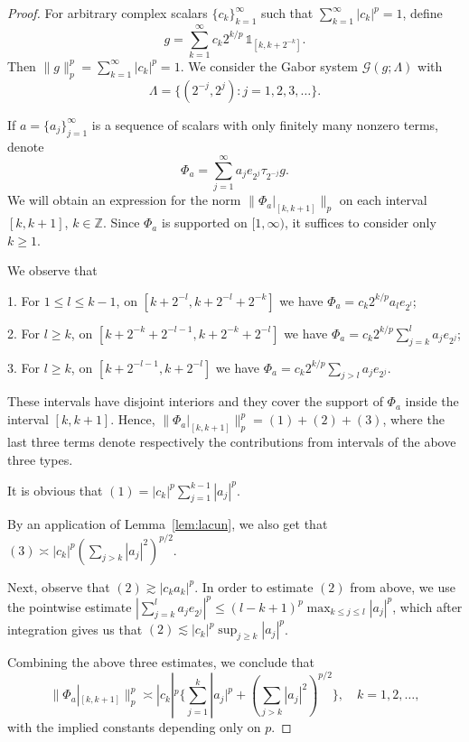 \documentclass[reqno,a4paper,12pt]{amsart}
\numberwithin{equation}{section}
\numberwithin{figure}{section}
\newcommand\Z{\mathbb{Z}}
\newcommand\G{\mathcal{G}}
\newcommand\Lam{\Lambda}
\newcommand\1{\mathds{1}}
\newcommand{\ts}{\tau}
\renewcommand\le{\leqslant}
\renewcommand\ge{\geqslant}
\theoremstyle{plain}
\newcommand{\lemref}[1]{Lemma~\ref{#1}}
\theoremstyle{definition}
\begin{document}
\begin{proof}
For arbitrary complex scalars $\{c_k\}_{k=1}^\infty$ such that $\sum_{k=1}^\infty |c_k|^p =1$, define
\begin{equation}
g = \sum_{k=1}^\infty c_k  2^{k/p} \, \1_{[k, k+2^{-k}]}.
\end{equation}
Then $\|g\|_p^p = \sum_{k=1}^\infty |c_k|^p = 1$.
We consider the Gabor system $\G(g;\Lambda)$ with
\begin{equation}\label{eq:example:set}
\Lam = \{ (2^{-j}, 2^j) : j=1,2,3,\dots \}.
\end{equation}


If  $a=\{a_j\}_{j=1}^\infty$ is a sequence of scalars with only finitely many nonzero terms, denote
\begin{equation}
\Phi_a = \sum_{j=1}^\infty a_j e_{2^j} \ts_{2^{-j}} g.
\end{equation}
We will obtain an expression for the norm $\|\Phi_a|_{[k,k+1]}\|_p$ on each interval $[k,k+1]$, $k\in\Z$. Since $\Phi_a$ is supported on $[1,  \infty)$, it suffices to consider only $k \ge 1$.

We observe that

1. For $1 \le l \le k-1$, on $[k+2^{-l}, k+2^{-l}+2^{-k}]$ we have $\Phi_a = c_k 2^{k/p} a_l e_{2^l}$;

2. For $l \ge k$, on $[ k+2^{-k}+2^{-l-1}, k+2^{-k}+2^{-l}]$ we have $\Phi_a = c_k 2^{k/p} \sum_{j=k}^{l} a_j e_{2^j}$;

3. For $l \ge k$, on $[ k+2^{-l-1}, k+2^{-l}]$ we have $\Phi_a = c_k 2^{k/p} \sum_{j>l} a_j e_{2^j} $.

These intervals have disjoint interiors and
they cover the support of $\Phi_a$ inside the interval $[k, k+1]$. Hence, $\|\Phi_a|_{[k,k+1]}\|_p^p = (1)+(2)+(3)$,
where the last three terms denote respectively the contributions from intervals of the above three types. 

It is obvious that 
$(1) = |c_k|^p \sum_{j=1}^{k-1} |a_j|^p$.

By an application of \lemref{lem:lacun}, we also get that
$(3) \asymp |c_k|^p (\sum_{j>k} |a_j|^2)^{p/2}$.

Next, observe that $(2) \gtrsim |c_k a_k|^p$. In order to estimate $(2)$ from above, we use the pointwise estimate
$ | \sum_{j=k}^{l} a_j e_{2^j} |^p \le (l-k+1)^p \max_{k \le j \le l}  |a_j|^p $, which after integration gives us that
$(2) \lesssim |c_k|^p \sup_{j \ge k} |a_j|^p$.



Combining the above three estimates, we conclude that
\begin{equation}
\label{eq:phi:k}
\|\Phi_a|_{[k,k+1]}\|_p^p \asymp
|c_k|^p \Big\{
\sum_{j=1}^{k} |a_j|^p + 
(\sum_{j>k} |a_j|^2)^{p/2} \Big\}, \quad k=1,2,\dots,
\end{equation}
with the implied constants depending only on $p$. 


\end{proof}
\end{document}
